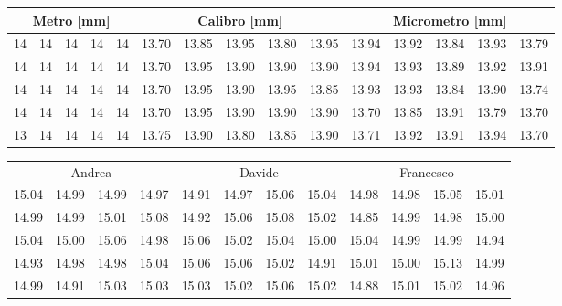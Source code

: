 \documentclass{article}
\begin{document}
\begin{table}
	\begin{tabular} { c c c c c|c c c c c|c c c c c }
		\toprule
		\multicolumn{5}{c}{Metro [mm]} & \multicolumn{5}{c}{Calibro [mm]} & \multicolumn{5}{c}{Micrometro [mm]} \\
		\midrule
		14 & 14 & 14 & 14 & 14 & 13.70 & 13.85 & 13.95 & 13.80 & 13.95 & 13.94 & 13.92 & 13.84 & 13.93 & 13.79 \\
		14 & 14 & 14 & 14 & 14 & 13.70 & 13.95 & 13.90 & 13.90 & 13.90 & 13.94 & 13.93 & 13.89 & 13.92 & 13.91 \\
		14 & 14 & 14 & 14 & 14 & 13.70 & 13.95 & 13.90 & 13.95 & 13.85 & 13.93 & 13.93 & 13.84 & 13.90 & 13.74 \\
		14 & 14 & 14 & 14 & 14 & 13.70 & 13.95 & 13.90 & 13.90 & 13.90 & 13.70 & 13.85 & 13.91 & 13.79 & 13.70 \\
		13 & 14 & 14 & 14 & 14 & 13.75 & 13.90 & 13.80 & 13.85 & 13.90 & 13.71 & 13.92 & 13.91 & 13.94 & 13.70 \\
	\bottomrule
	\end{tabular}
\end{table}

\begin{table}
	\begin{tabular} {c c c c | c c c c | c c c c}
		\toprule
		\multicolumn{4}{c}{Andrea} & \multicolumn{4}{c}{Davide} & \multicolumn{4}{c}{Francesco} \\
		15.04 & 14.99 & 14.99 & 14.97 & 14.91 & 14.97 & 15.06 & 15.04 & 14.98 & 14.98 & 15.05 & 15.01 \\
		14.99 & 14.99 & 15.01 & 15.08 & 14.92 & 15.06 & 15.08 & 15.02 & 14.85 & 14.99 & 14.98 & 15.00 \\
		15.04 & 15.00 & 15.06 & 14.98 & 15.06 & 15.02 & 15.04 & 15.00 & 15.04 & 14.99 & 14.99 & 14.94 \\
		14.93 & 14.98 & 14.98 & 15.04 & 15.06 & 15.06 & 15.02 & 14.91 & 15.01 & 15.00 & 15.13 & 14.99 \\
		14.99 & 14.91 & 15.03 & 15.03 & 15.03 & 15.02 & 15.06 & 15.02 & 14.88 & 15.01 & 15.02 & 14.96 \\
		\bottomrule
	\end{tabular}
\end{table}
\end{document}
